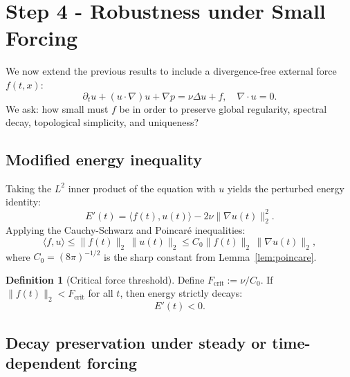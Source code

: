 \documentclass[11pt]{article}
\theoremstyle{definition}
\newtheorem{definition}[theorem]{Definition}
\begin{document}
\section{Step 4 - Robustness under Small Forcing}
\label{sec:step4}

We now extend the previous results to include a divergence-free external force $f(t,x)$:
\[
\partial_t u + (u \cdot \nabla)u + \nabla p = \nu \Delta u + f,\quad \nabla \cdot u = 0.
\]
We ask: how small must $f$ be in order to preserve global regularity, spectral decay, topological simplicity, and uniqueness?

\subsection{Modified energy inequality}

Taking the $L^2$ inner product of the equation with $u$ yields the perturbed energy identity:
\[
E'(t) = \langle f(t), u(t) \rangle - 2\nu \|\nabla u(t)\|_2^2.
\]
Applying the Cauchy-Schwarz and Poincaré inequalities:
\[
\langle f, u \rangle \le \|f(t)\|_2\, \|u(t)\|_2 \le C_0 \|f(t)\|_2\, \|\nabla u(t)\|_2,
\]
where $C_0 = (8\pi)^{-1/2}$ is the sharp constant from Lemma~\ref{lem:poincare}.

\begin{definition}[Critical force threshold]
Define $F_{\text{crit}} := \nu / C_0$. If $\|f(t)\|_2 < F_{\text{crit}}$ for all $t$, then energy strictly decays:
\[
E'(t) < 0.
\]
\end{definition}

\subsection{Decay preservation under steady or time-dependent forcing}
\end{document}
